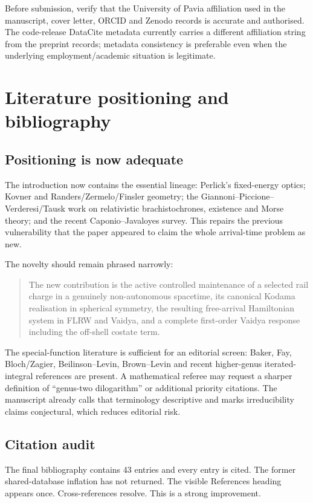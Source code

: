 \documentclass[11pt,a4paper]{article}
\begin{document}
Before submission, verify that the University of Pavia affiliation used in the manuscript,
cover letter, ORCID and Zenodo records is accurate and authorised. The code-release DataCite
metadata currently carries a different affiliation string from the preprint records; metadata
consistency is preferable even when the underlying employment/academic situation is legitimate.

\clearpage
\section{Literature positioning and bibliography}

\subsection{Positioning is now adequate}

The introduction now contains the essential lineage: Perlick's fixed-energy optics; Kovner and
Randers/Zermelo/Finsler geometry; the Giannoni--Piccione--Verderesi/Tausk work on relativistic
brachistochrones, existence and Morse theory; and the recent Caponio--Javaloyes survey. This
repairs the previous vulnerability that the paper appeared to claim the whole arrival-time
problem as new.

The novelty should remain phrased narrowly:
\begin{quote}
The new contribution is the active controlled maintenance of a selected rail charge in a
genuinely non-autonomous spacetime, its canonical Kodama realisation in spherical symmetry,
the resulting free-arrival Hamiltonian system in FLRW and Vaidya, and a complete first-order
Vaidya response including the off-shell costate term.
\end{quote}

The special-function literature is sufficient for an editorial screen: Baker, Fay,
Bloch/Zagier, Beilinson--Levin, Brown--Levin and recent higher-genus iterated-integral references
are present. A mathematical referee may request a sharper definition of ``genus-two
dilogarithm'' or additional priority citations. The manuscript already calls that terminology
descriptive and marks irreducibility claims conjectural, which reduces editorial risk.

\subsection{Citation audit}

The final bibliography contains 43 entries and every entry is cited. The former shared-database
inflation has not returned. The visible References heading appears once. Cross-references resolve.
This is a strong improvement.
\end{document}
